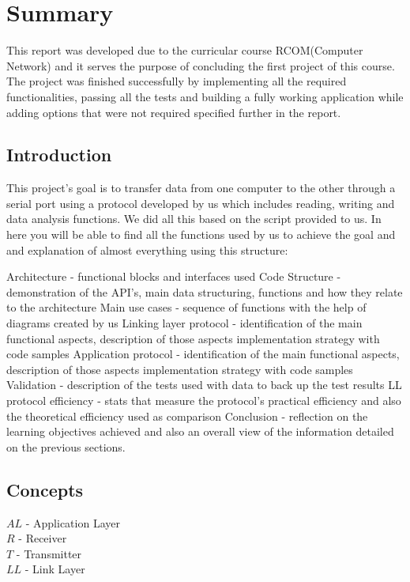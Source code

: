 \documentclass[main.tex]{subfiles}
\begin{document}
\section{Summary}
\label{sec:summary}
   
This report was developed due to the curricular course RCOM(Computer Network) and it serves the purpose of concluding the first project of this course.
The project was finished successfully by implementing all the required functionalities, passing all the tests and building a fully working application while adding options that were not required specified further in the report.

\subsection{Introduction}
\label{subsec:intro}

This project’s goal is to transfer data from one computer to the other through a serial port using a protocol developed by us which includes reading, writing and data analysis functions.
We did all this based on the script provided to us.
In here you will be able to find all the functions used by us to achieve the goal and and explanation of almost everything using this structure:

Architecture - functional blocks and interfaces used
Code Structure - demonstration of the API’s, main data structuring, functions and how they relate to the architecture
Main use cases - sequence of functions with the help of diagrams created by us
Linking layer protocol - identification of the main functional aspects, description of those aspects implementation strategy with code samples
Application protocol - identification of the main functional aspects, description of those aspects implementation strategy with code samples
Validation - description of the tests used with data to back up the test results
LL protocol efficiency - stats that measure the protocol’s practical efficiency and also the theoretical efficiency used as comparison
Conclusion - reflection on the learning objectives achieved and also an overall view of the information detailed on the previous sections.

\subsection{Concepts}
\label{subsec:concepts}

$AL$ - Application Layer\\
$R$ - Receiver\\
$T$ - Transmitter\\
$LL$ - Link Layer\\
\end{document}
